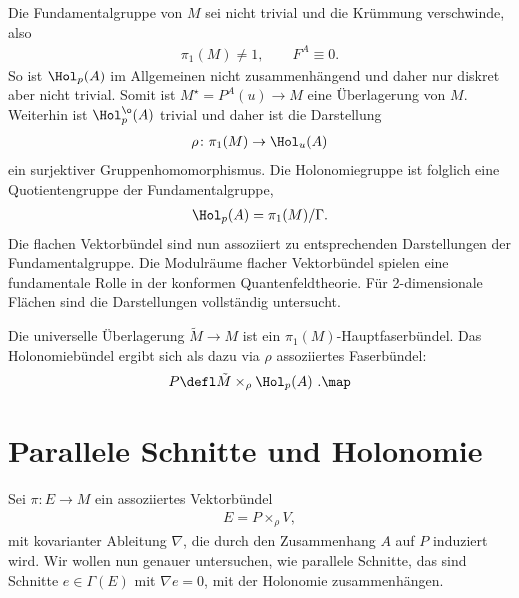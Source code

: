 \documentclass[%
	paper=a5,%
	fleqn,%
	DIV=18,%
	BCOR=0mm,
	fontsize=11pt,
	titlepage=false,%
	bibliography=totoc,
	DIV=18,%
	twoside=true,
	pdftitle=Riemannsche Geometrie,
	pdfauthor=Uwe Semmelmann,
	numbers=noendperiod]%
	{scrbook}
\begin{document}
\begin{rem}
Die Fundamentalgruppe von $M$ sei nicht trivial und die Krümmung verschwinde, also
\begin{align*}
\pi_{1}(M)\neq 1,\qquad F^A\equiv 0.
\end{align*}
So ist $\Hol_{p}(A)$ im Allgemeinen nicht zusammenhängend und daher nur diskret aber nicht trivial. Somit ist $M^\star = P^A(u)\to M$ eine Überlagerung von $M$. Weiterhin ist $\Hol_{p}^\o(A)$ trivial und daher ist die Darstellung
\begin{align*}
\rho\colon \pi_{1}(M)\to \Hol_{u}(A)
\end{align*}
ein surjektiver Gruppenhomomorphismus. Die Holonomiegruppe ist folglich eine Quotientengruppe der Fundamentalgruppe,
\begin{align*}
\Hol_{p}(A) = \pi_{1}(M)/\Gamma.
\end{align*}
Die flachen Vektorbündel sind nun assoziiert zu entsprechenden Darstellungen der Fundamentalgruppe. Die Modulr\"aume
flacher Vektorb\"undel  spielen eine fundamentale Rolle in der konformen Quantenfeldtheorie. Für 2-dimensionale Flächen sind die Darstellungen vollständig untersucht.

Die universelle Überlagerung  $\tilde M \to M$ ist ein $\pi_{1}(M)$-Hauptfaserbündel. Das Holonomiebündel ergibt sich
als dazu via $\rho$ assoziiertes Faserbündel:
\begin{align*}
P\defl \tilde M \times_{\rho}\Hol_{p}(A) \ .\map
\end{align*}

\end{rem}



\section{Parallele Schnitte und Holonomie}

Sei $\pi\colon E\to M$ ein assoziiertes Vektorbündel
\begin{align*}
E = P\times_\rho V,
\end{align*}
mit kovarianter Ableitung $\nabla$, die durch den Zusammenhang $A$ auf $P$ induziert wird. Wir wollen nun genauer untersuchen, wie parallele Schnitte, das sind Schnitte $e\in\Gamma(E)$ mit $\nabla e = 0$, mit der Holonomie zusammenhängen.
\end{document}
